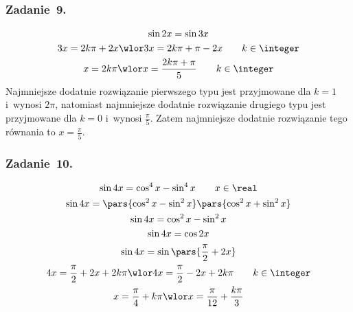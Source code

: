 \subsubsection*{Zadanie~9.}
\begin{gather*}
    \sin2x = \sin3x\\
    3x = 2k\pi + 2x \wlor 3x = 2k\pi + \pi - 2x \qquad k \in \integer\\
    x = 2k\pi \wlor x = \frac{2k\pi + \pi}{5} \qquad k \in \integer
\end{gather*}
Najmniejsze dodatnie rozwiązanie pierwszego typu jest przyjmowane dla \(k = 1\) i~wynosi \(2\pi\), natomiast najmniejsze dodatnie rozwiązanie drugiego typu jest przyjmowane dla \(k = 0\) i~wynosi \(\frac{\pi}{5}\). Zatem najmniejsze dodatnie rozwiązanie tego równania to \(x = \frac{\pi}{5}\).
\subsubsection*{Zadanie~10.}
\begin{gather*}
    \sin4x = \cos^4x - \sin^4x \qquad x \in \real\\
    \sin4x = \pars{\cos^2x - \sin^2x}\pars{\cos^2x + \sin^2x}\\
    \sin4x = \cos^2x - \sin^2x\\
    \sin4x = \cos2x\\
    \sin4x = \sin\pars{\frac{\pi}{2} + 2x}\\
    4x = \frac{\pi}{2} + 2x + 2k\pi \wlor 4x = \frac{\pi}{2} - 2x + 2k\pi \qquad k \in \integer\\
    x = \frac{\pi}{4} + k\pi \wlor x = \frac{\pi}{12} + \frac{k\pi}{3}
\end{gather*}
